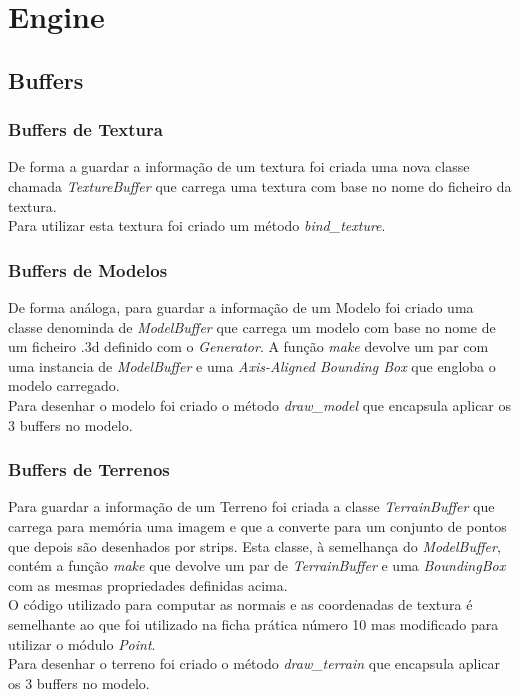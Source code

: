 \documentclass[a4paper]{report}
\begin{document}
\chapter{Engine}

\section{Buffers}
\subsection{Buffers de Textura}
De forma a guardar a informação de um textura foi criada uma nova classe
chamada \textit{TextureBuffer} que carrega uma textura com base no nome do
ficheiro da textura.\\
Para utilizar esta textura foi criado um método \textit{bind\_texture}.

\subsection{Buffers de Modelos}
De forma análoga, para guardar a informação de um Modelo foi criado uma classe
denominda de \textit{ModelBuffer} que carrega um modelo com base no nome de um
ficheiro .3d definido com o \textit{Generator}. A função \textit{make} devolve
um par com uma instancia de \textit{ModelBuffer} e uma \textit{Axis-Aligned
Bounding Box} que engloba o modelo carregado.\\
Para desenhar o modelo foi criado o método \textit{draw\_model} que encapsula
aplicar os 3 buffers no modelo.\\

\subsection{Buffers de Terrenos}
Para guardar a informação de um Terreno foi criada a classe
\textit{TerrainBuffer} que carrega para memória uma imagem e que a converte para
um conjunto de pontos que depois são desenhados por strips. Esta classe, à
semelhança do \textit{ModelBuffer}, contém a função \textit{make} que devolve um
par de \textit{TerrainBuffer} e uma \textit{BoundingBox} com as mesmas
propriedades definidas acima.\\
O código utilizado para computar as normais e as coordenadas de textura é
semelhante ao que foi utilizado na ficha prática número 10 mas modificado para
utilizar o módulo \textit{Point}.\\
Para desenhar o terreno foi criado o método \textit{draw\_terrain} que encapsula
aplicar os 3 buffers no modelo.\\
\end{document}
